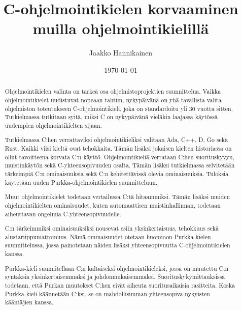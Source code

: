 \documentclass[gradu]{tktltiki}
\begin{document}
\title{C-ohjelmointikielen korvaaminen muilla ohjelmointikielillä}
\author{Jaakko Hannikainen}
\date{\today}

\hypersetup{pageanchor=false}
\maketitle
\hypersetup{pageanchor=false}



\begin{abstract}
    Ohjelmointikielen valinta on tärkeä osa ohjelmistoprojektien suunnittelua.
    Vaikka ohjelmointikielet uudistuvat nopeaan tahtiin, nykypäivänä on yhä
    tavallista valita ohjelmiston toteutukseen C-ohjelmointikieli, joka on
    standardoitu yli 30 vuotta sitten. Tutkielmassa tutkitaan syitä, miksi C on
    nykypäivänä vieläkin laajassa käytössä uudempien ohjelmointikielten sijaan.

    Tutkielmassa C:hen verrattaviksi ohjelmointikieliksi valitaan Ada, C++, D,
    Go sekä Rust. Kaikki viisi kieltä ovat tehokkaita. Tämän lisäksi jokaisen
    kielten historiassa on ollut tavoitteena korvata C:n käyttö.
    Ohjelmointikieliä verrataan C:hen suorituskyvyn, muistinkäytön sekä
    C-yhteensopivuuden osalta. Tämän lisäksi tutkielmassa selvitetään
    tärkeimpiä C:n ominaisuuksia sekä C:n kehitettävissä olevia ominaisuuksia.
    Tuloksia käytetään uuden Purkka-ohjelmointikielen suunnitteluun.

    Muut ohjelmointikielet todetaan vertailussa C:tä hitaammiksi. Tämän lisäksi
    muiden ohjelmointikielten ominaisuudet, kuten automaattisen
    muistinhallinnan, todetaan aiheuttavan ongelmia C-yhteensopivuudelle.

    C:n tärkeimmiksi ominaisuuksiksi nousevat esiin yksinkertaisuus, tehokkuus
    sekä alustariippumattomuus. Nämä ominaisuudet otetaan huomioon
    Purkka-kielen suunnittelussa, jossa painotetaan näiden lisäksi
    yhteensopivuutta C-ohjelmointikielen kanssa.
    
    Purkka-kieli suunnitellaan C:n kaltaiseksi ohjelmointikieleksi, jossa on
    muutettu C:n syntaksia yksinkertaisemmaksi ja johdonmukaisemmaksi.
    Suorituskykymittauksissa todetaan, että Purkan muutokset C:hen eivät
    aiheuta suoritusaikaisia rasitteita. Koska Purkka-kieli käännetään C:ksi,
    se on mahdollisimman yhteensopiva nykyisten kääntäjien kanssa.
\end{abstract}
\end{document}
